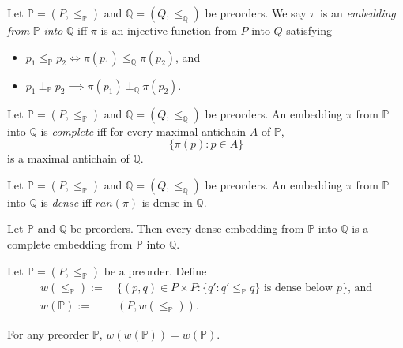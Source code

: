 \documentclass[12pt]{article}
\numberwithin{equation}{section}
\begin{document}
\begin{defi}
Let $\mathbb{P} = (P, \leq_{\mathbb{P}})$ and $\mathbb{Q} = (Q, \leq_{\mathbb{Q}})$ be preorders. We say $\pi$ is an \emph{embedding from} $\mathbb{P}$ \emph{into} $\mathbb{Q}$ iff $\pi$ is an injective function from $P$ into $Q$ satisfying
\begin{itemize}
    \item $p_1 \leq_{\mathbb{P}} p_2 \iff \pi(p_1) \leq_{\mathbb{Q}} \pi(p_2)$, and
    \item $p_1 \ \bot_{\mathbb{P}} \ p_2 \implies \pi(p_1) \ \bot_{\mathbb{Q}} \ \pi(p_2)$.
\end{itemize}
\end{defi}

\begin{defi}
Let $\mathbb{P} = (P, \leq_{\mathbb{P}})$ and $\mathbb{Q} = (Q, \leq_{\mathbb{Q}})$ be preorders. An embedding $\pi$ from $\mathbb{P}$ into $\mathbb{Q}$ is \emph{complete} iff for every maximal antichain $A$ of $\mathbb{P}$, $$\{\pi(p) : p \in A\}$$ is a maximal antichain of $\mathbb{Q}$.
\end{defi}

\begin{defi}
Let $\mathbb{P} = (P, \leq_{\mathbb{P}})$ and $\mathbb{Q} = (Q, \leq_{\mathbb{Q}})$ be preorders. An embedding $\pi$ from $\mathbb{P}$ into $\mathbb{Q}$ is \emph{dense} iff $ran(\pi)$ is dense in $\mathbb{Q}$.
\end{defi}

\begin{fact}\label{dic}
Let $\mathbb{P}$ and $\mathbb{Q}$ be preorders. Then every dense embedding from $\mathbb{P}$ into $\mathbb{Q}$ is a complete embedding from $\mathbb{P}$ into $\mathbb{Q}$.
\end{fact}

\begin{defi}
Let $\mathbb{P} = (P, \leq_{\mathbb{P}})$ be a preorder. Define \begin{align*}
    w(\leq_{\mathbb{P}}) := \ & \{(p, q) \in P \times P : \{q' : q' \leq_{\mathbb{P}} q\} \text{ is dense below } p\} \text{, and} \\
    w(\mathbb{P}) := \ & (P, w(\leq_{\mathbb{P}})) \text{.}
\end{align*}
\end{defi}

\begin{fact}\label{wfixedp}
For any preorder $\mathbb{P}$, $w(w(\mathbb{P})) = w(\mathbb{P})$.
\end{fact}
\end{document}
